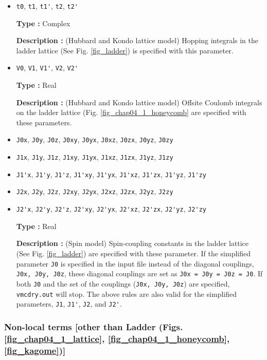 \begin{itemize}
\item \verb|t0|,  \verb|t1|,  \verb|t1'|,  \verb|t2|,  \verb|t2'|

{\bf Type :} Complex

{\bf Description :} (Hubbard and Kondo lattice model)
Hopping integrals in the ladder lattice 
(See Fig. \ref{fig_ladder}) is specified with this parameter.

\item \verb|V0|,  \verb|V1|,  \verb|V1'|,  \verb|V2|,  \verb|V2'|

{\bf Type :} Real

{\bf Description :} (Hubbard and Kondo lattice model)
Offsite Coulomb integrals on the ladder lattice
(Fig. \ref{fig_chap04_1_honeycomb} are specified with these parameters.

\item \verb|J0x|, \verb|J0y|, \verb|J0z|, \verb|J0xy|, 
  \verb|J0yx|, \verb|J0xz|, \verb|J0zx|, \verb|J0yz|, \verb|J0zy|
\item \verb|J1x|, \verb|J1y|, \verb|J1z|, \verb|J1xy|, 
  \verb|J1yx|, \verb|J1xz|, \verb|J1zx|, \verb|J1yz|, \verb|J1zy|
\item \verb|J1'x|, \verb|J1'y|, \verb|J1'z|, \verb|J1'xy|, 
  \verb|J1'yx|, \verb|J1'xz|, \verb|J1'zx|, \verb|J1'yz|, \verb|J1'zy|
\item \verb|J2x|, \verb|J2y|, \verb|J2z|, \verb|J2xy|, 
  \verb|J2yx|, \verb|J2xz|, \verb|J2zx|, \verb|J2yz|, \verb|J2zy|
\item \verb|J2'x|, \verb|J2'y|, \verb|J2'z|, \verb|J2'xy|, 
  \verb|J2'yx|, \verb|J2'xz|, \verb|J2'zx|, \verb|J2'yz|, \verb|J2'zy|

{\bf Type :} Real

{\bf Description :} (Spin model)
Spin-coupling constants in the ladder lattice
(See Fig. \ref{fig_ladder}) are specified with these parameter.
If the simplified parameter \verb|J0| is specified in the input file instead of
the diagonal couplings, \verb|J0x, J0y, J0z|,
these diagonal couplings are set as \verb|J0x = J0y = J0z = J0|.
If both \verb|J0| and the set of the couplings (\verb|J0x, J0y, J0z|)
are specified, \verb|vmcdry.out| will stop.
The above rules are also valid for the simplified parameters, \verb|J1|, \verb|J1'|, \verb|J2|, and \verb|J2'|.

\end{itemize}

\subsubsection{Non-local terms [other than Ladder (Figs. \ref{fig_chap04_1_lattice}, \ref{fig_chap04_1_honeycomb},
\ref{fig_kagome})]}

